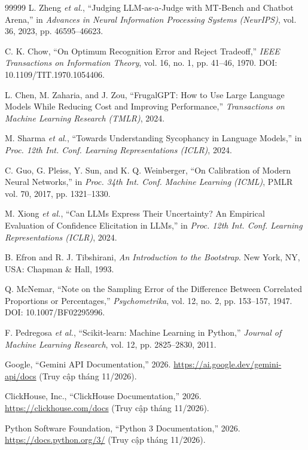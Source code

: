 \documentclass[a4paper,table]{article}
\theoremstyle{definition}
\begin{document}
\begin{thebibliography}{99999}
L. Zheng \textit{et al.}, ``Judging LLM-as-a-Judge with MT-Bench and Chatbot Arena,'' in \textit{Advances in Neural Information Processing Systems (NeurIPS)}, vol. 36, 2023, pp. 46595--46623.

C. K. Chow, ``On Optimum Recognition Error and Reject Tradeoff,'' \textit{IEEE Transactions on Information Theory}, vol. 16, no. 1, pp. 41--46, 1970. DOI: 10.1109/TIT.1970.1054406.

L. Chen, M. Zaharia, and J. Zou, ``FrugalGPT: How to Use Large Language Models While Reducing Cost and Improving Performance,'' \textit{Transactions on Machine Learning Research (TMLR)}, 2024.

M. Sharma \textit{et al.}, ``Towards Understanding Sycophancy in Language Models,'' in \textit{Proc. 12th Int. Conf. Learning Representations (ICLR)}, 2024.

C. Guo, G. Pleiss, Y. Sun, and K. Q. Weinberger, ``On Calibration of Modern Neural Networks,'' in \textit{Proc. 34th Int. Conf. Machine Learning (ICML)}, PMLR vol. 70, 2017, pp. 1321--1330.

M. Xiong \textit{et al.}, ``Can LLMs Express Their Uncertainty? An Empirical Evaluation of Confidence Elicitation in LLMs,'' in \textit{Proc. 12th Int. Conf. Learning Representations (ICLR)}, 2024.

B. Efron and R. J. Tibshirani, \textit{An Introduction to the Bootstrap}. New York, NY, USA: Chapman \& Hall, 1993.

Q. McNemar, ``Note on the Sampling Error of the Difference Between Correlated Proportions or Percentages,'' \textit{Psychometrika}, vol. 12, no. 2, pp. 153--157, 1947. DOI: 10.1007/BF02295996.

F. Pedregosa \textit{et al.}, ``Scikit-learn: Machine Learning in Python,'' \textit{Journal of Machine Learning Research}, vol. 12, pp. 2825--2830, 2011.

Google, ``Gemini API Documentation,'' 2026. \url{https://ai.google.dev/gemini-api/docs} (Truy cập tháng 11/2026).

ClickHouse, Inc., ``ClickHouse Documentation,'' 2026. \url{https://clickhouse.com/docs} (Truy cập tháng 11/2026).

Python Software Foundation, ``Python 3 Documentation,'' 2026. \url{https://docs.python.org/3/} (Truy cập tháng 11/2026).


\end{thebibliography}
\end{document}
